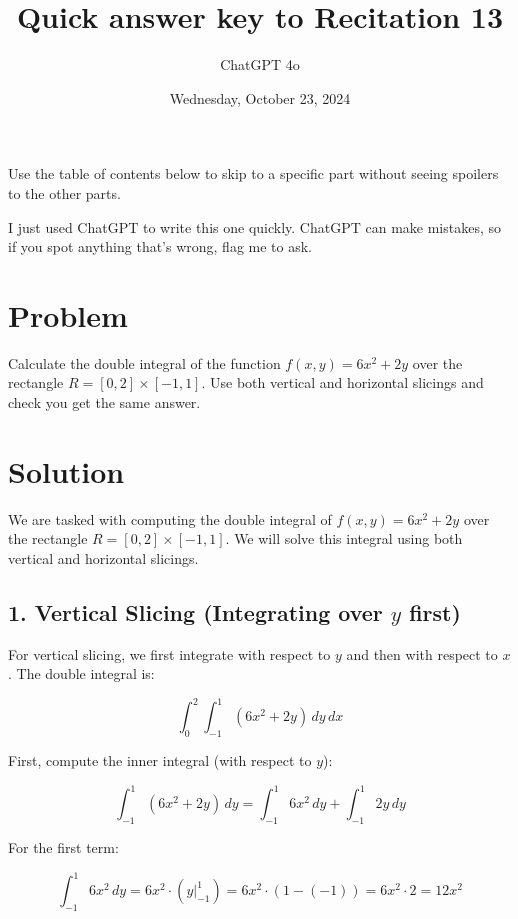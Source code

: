 \documentclass[11pt]{article}
\begin{document}
\title{Quick answer key to Recitation 13}
\author{ChatGPT 4o}
\date{Wednesday, October 23, 2024}
\maketitle

Use the table of contents below to skip to a specific part
without seeing spoilers to the other parts.

I just used ChatGPT to write this one quickly.
ChatGPT can make mistakes, so if you spot anything that's wrong, flag me to ask.

\tableofcontents



\newpage

\section{Problem}
Calculate the double integral of the function \( f(x, y) = 6x^2 + 2y \) over the rectangle \( R = [0, 2] \times [-1, 1] \). Use both vertical and horizontal slicings and check you get the same answer.

\newpage

\section{Solution}

We are tasked with computing the double integral of \( f(x, y) = 6x^2 + 2y \) over the rectangle \( R = [0, 2] \times [-1, 1] \). We will solve this integral using both vertical and horizontal slicings.

\newpage

\subsection{1. Vertical Slicing (Integrating over \(y\) first)}

For vertical slicing, we first integrate with respect to \(y\) and then with respect to \(x\). The double integral is:

\[
\int_0^2 \int_{-1}^1 (6x^2 + 2y) \, dy \, dx
\]

First, compute the inner integral (with respect to \(y\)):

\[
\int_{-1}^1 (6x^2 + 2y) \, dy = \int_{-1}^1 6x^2 \, dy + \int_{-1}^1 2y \, dy
\]

For the first term:

\[
\int_{-1}^1 6x^2 \, dy = 6x^2 \cdot (y \bigg|_{-1}^1) = 6x^2 \cdot (1 - (-1)) = 6x^2 \cdot 2 = 12x^2
\]
\end{document}
